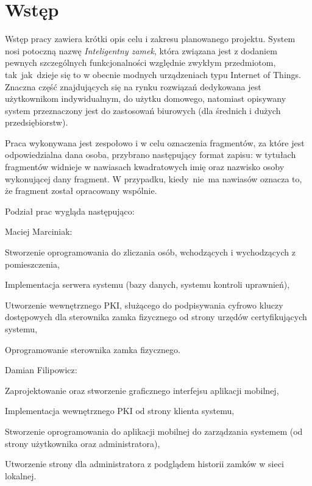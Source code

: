 \documentclass[twoside,10pt]{article}
\def\NazwaSys {\textit{Inteligentny zamek}}
\begin{document}
\newpage\tableofcontents     %
\newpage\section{Wstęp}\label{sec:wstep}
Wstęp pracy zawiera krótki opis celu i zakresu planowanego projektu. System nosi potoczną nazwę \linebreak \NazwaSys, która związana jest z dodaniem  pewnych szczególnych funkcjonalności względnie zwykłym przedmiotom, tak~jak~dzieje się to w obecnie modnych urządzeniach\cite{porownanie zamkow} typu Internet of Things. Znaczna część znajdujących się na rynku rozwiązań dedykowana jest użytkownikom indywidualnym, do użytku domowego, natomiast opisywany system przeznaczony jest do zastosowań biurowych (dla średnich i dużych przedsiębiorstw).

Praca wykonywana jest zespołowo i w celu oznaczenia fragmentów, za które jest odpowiedzialna dana osoba, przybrano następujący format zapisu: w  tytułach fragmentów widnieje w nawiasach kwadratowych imię oraz nazwisko osoby wykonującej dany fragment. W przypadku, kiedy~nie~ma nawiasów oznacza to, że fragment został opracowany wspólnie.

Podział prac wygląda następująco:
\begin{itemize*}
\item Maciej Marciniak:
\begin{enumerate*}
\item Stworzenie oprogramowania do zliczania osób, wchodzących i wychodzących z pomieszczenia,
\item Implementacja serwera systemu (bazy danych, systemu kontroli uprawnień),
\item Utworzenie wewnętrznego PKI, służącego do podpisywania cyfrowo kluczy dostępowych dla sterownika zamka fizycznego od strony urzędów certyfikujących systemu,
\item Oprogramowanie sterownika zamka fizycznego.
\end{enumerate*}
\item Damian Filipowicz:
\begin{enumerate*}
\item Zaprojektowanie oraz stworzenie graficznego interfejsu aplikacji mobilnej,
\item Implementacja wewnętrznego PKI od strony klienta systemu,
\item Stworzenie oprogramowania do aplikacji mobilnej do zarządzania systemem (od strony użytkownika oraz administratora),
\item Utworzenie strony dla administratora z podglądem historii zamków w sieci lokalnej.
\end{enumerate*}
\end{itemize*}
\end{document}
